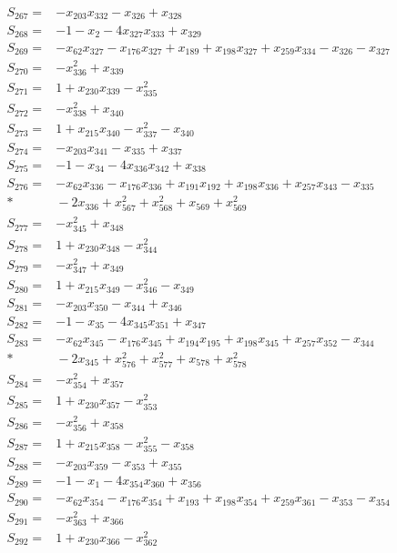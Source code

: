 \begin{align*}
S_{267}={}&-x_{203}x_{332}-x_{326}+x_{328}\\[3pt]
S_{268}={}&-1-x_{2}-4x_{327}x_{333}+x_{329}\\[3pt]
S_{269}={}&-x_{62}x_{327}-x_{176}x_{327}+x_{189}+x_{198}x_{327}+x_{259}x_{334}-x_{326}-x_{327}\\[3pt]
S_{270}={}&-x_{336}^{2}+x_{339}\\[3pt]
S_{271}={}&1+x_{230}x_{339}-x_{335}^{2}\\[3pt]
S_{272}={}&-x_{338}^{2}+x_{340}\\[3pt]
S_{273}={}&1+x_{215}x_{340}-x_{337}^{2}-x_{340}\\[3pt]
S_{274}={}&-x_{203}x_{341}-x_{335}+x_{337}\\[3pt]
S_{275}={}&-1-x_{34}-4x_{336}x_{342}+x_{338}\\[3pt]
S_{276}={}&-x_{62}x_{336}-x_{176}x_{336}+x_{191}x_{192}+x_{198}x_{336}+x_{257}x_{343}-x_{335}\\*
&{}-2x_{336}+x_{567}^{2}+x_{568}^{2}+x_{569}+x_{569}^{2}\\[3pt]
S_{277}={}&-x_{345}^{2}+x_{348}\\[3pt]
S_{278}={}&1+x_{230}x_{348}-x_{344}^{2}\\[3pt]
S_{279}={}&-x_{347}^{2}+x_{349}\\[3pt]
S_{280}={}&1+x_{215}x_{349}-x_{346}^{2}-x_{349}\\[3pt]
S_{281}={}&-x_{203}x_{350}-x_{344}+x_{346}\\[3pt]
S_{282}={}&-1-x_{35}-4x_{345}x_{351}+x_{347}\\[3pt]
S_{283}={}&-x_{62}x_{345}-x_{176}x_{345}+x_{194}x_{195}+x_{198}x_{345}+x_{257}x_{352}-x_{344}\\*
&{}-2x_{345}+x_{576}^{2}+x_{577}^{2}+x_{578}+x_{578}^{2}\\[3pt]
S_{284}={}&-x_{354}^{2}+x_{357}\\[3pt]
S_{285}={}&1+x_{230}x_{357}-x_{353}^{2}\\[3pt]
S_{286}={}&-x_{356}^{2}+x_{358}\\[3pt]
S_{287}={}&1+x_{215}x_{358}-x_{355}^{2}-x_{358}\\[3pt]
S_{288}={}&-x_{203}x_{359}-x_{353}+x_{355}\\[3pt]
S_{289}={}&-1-x_{1}-4x_{354}x_{360}+x_{356}\\[3pt]
S_{290}={}&-x_{62}x_{354}-x_{176}x_{354}+x_{193}+x_{198}x_{354}+x_{259}x_{361}-x_{353}-x_{354}\\[3pt]
S_{291}={}&-x_{363}^{2}+x_{366}\\[3pt]
S_{292}={}&1+x_{230}x_{366}-x_{362}^{2}\\[3pt]

\end{align*}
